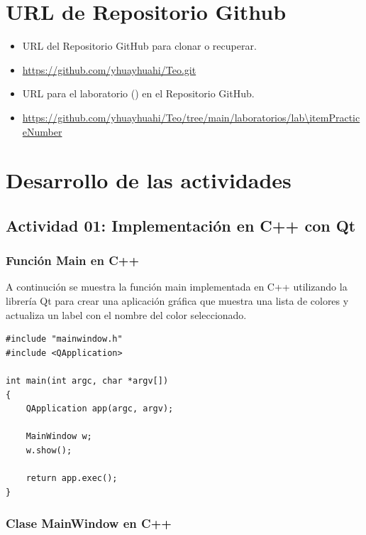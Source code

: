 \section{URL de Repositorio Github}

\begin{itemize}
    \item URL del Repositorio GitHub para clonar o recuperar.
    \item \url{https://github.com/yhuayhuahi/Teo.git}
    \item URL para el laboratorio (\itemPracticeNumber) en el Repositorio GitHub.
    \item \url{https://github.com/yhuayhuahi/Teo/tree/main/laboratorios/lab\itemPracticeNumber}
\end{itemize}




\section{Desarrollo de las actividades}

\subsection {Actividad 01: Implementación en C++ con Qt}

\subsubsection {Función Main en C++}

A continución se muestra la función main implementada en C++ utilizando la librería Qt para crear una aplicación gráfica que muestra una lista de colores y actualiza un label con el nombre del color seleccionado.

\begin{lstlisting}[style=cpp-style, caption={Función Main en cpp - Primera implementación}]
#include "mainwindow.h"
#include <QApplication>

int main(int argc, char *argv[])
{
    QApplication app(argc, argv);

    MainWindow w;
    w.show();

    return app.exec();
}
\end{lstlisting}



\subsubsection {Clase MainWindow en C++}

